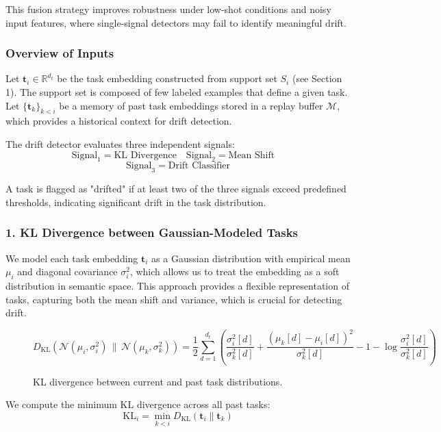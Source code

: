 \documentclass[conference]{IEEEtran}
\begin{document}
This fusion strategy improves robustness under low-shot conditions and noisy input features, where single-signal detectors may fail to identify meaningful drift.

\subsubsection*{Overview of Inputs}

Let $\mathbf{t}_i \in \mathbb{R}^{d_t}$ be the task embedding constructed from support set $S_i$ (see Section 1). The support set is composed of few labeled examples that define a given task. Let $\{\mathbf{t}_k\}_{k<i}$ be a memory of past task embeddings stored in a replay buffer $\mathcal{M}$, which provides a historical context for drift detection.

The drift detector evaluates three independent signals:
\[
\text{Signal}_1 = \text{KL Divergence}  \quad
\text{Signal}_2 = \text{Mean Shift}  \quad \]
\[ \text{Signal}_3 = \text{Drift Classifier}
\]

A task is flagged as "drifted" if at least two of the three signals exceed predefined thresholds, indicating significant drift in the task distribution.

\subsubsection*{1. KL Divergence between Gaussian-Modeled Tasks}

We model each task embedding $\mathbf{t}_i$ as a Gaussian distribution with empirical mean $\mu_i$ and diagonal covariance $\sigma_i^2$, which allows us to treat the embedding as a soft distribution in semantic space. This approach provides a flexible representation of tasks, capturing both the mean shift and variance, which is crucial for detecting drift.

\begin{figure*}[t]
\centering
\begin{equation*}
D_{\mathrm{KL}}(\mathcal{N}(\mu_i, \sigma_i^2) \, \| \, \mathcal{N}(\mu_k, \sigma_k^2)) = 
\frac{1}{2} \sum_{d=1}^{d_t} \left( \frac{\sigma_i^2[d]}{\sigma_k^2[d]} + \frac{(\mu_k[d] - \mu_i[d])^2}{\sigma_k^2[d]} - 1 - \log \frac{\sigma_i^2[d]}{\sigma_k^2[d]} \right)
\end{equation*}
\caption{KL divergence between current and past task distributions.}
\label{eq:kl_divergence}
\end{figure*}

We compute the minimum KL divergence across all past tasks:
\[
\text{KL}_i = \min_{k<i} D_{\mathrm{KL}}(\mathbf{t}_i \| \mathbf{t}_k)
\]
\end{document}
